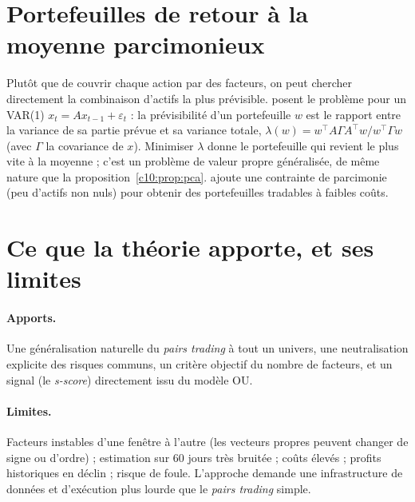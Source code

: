 \section{Portefeuilles de retour à la moyenne parcimonieux}

Plutôt que de couvrir chaque action par des facteurs, on peut chercher directement la combinaison d'actifs la plus prévisible. \citet{boxtiao1977} posent le problème pour un VAR(1) $x_t = Ax_{t-1} + \varepsilon_t$ : la prévisibilité d'un portefeuille $w$ est le rapport entre la variance de sa partie prévue et sa variance totale, $\lambda(w) = w^\top A\Gamma A^\top w/w^\top\Gamma w$ (avec $\Gamma$ la covariance de $x$). Minimiser $\lambda$ donne le portefeuille qui revient le plus vite à la moyenne ; c'est un problème de valeur propre généralisée, de même nature que la proposition~\ref{c10:prop:pca}. \citet{daspremont2011} ajoute une contrainte de parcimonie (peu d'actifs non nuls) pour obtenir des portefeuilles tradables à faibles coûts.

\section{Ce que la théorie apporte, et ses limites}

\paragraph{Apports.} Une généralisation naturelle du \emph{pairs trading} à tout un univers, une neutralisation explicite des risques communs, un critère objectif du nombre de facteurs, et un signal (le \emph{s-score}) directement issu du modèle OU.

\paragraph{Limites.} Facteurs instables d'une fenêtre à l'autre (les vecteurs propres peuvent changer de signe ou d'ordre) ; estimation sur 60 jours très bruitée ; coûts élevés ; profits historiques en déclin ; risque de foule. L'approche demande une infrastructure de données et d'exécution plus lourde que le \emph{pairs trading} simple.

